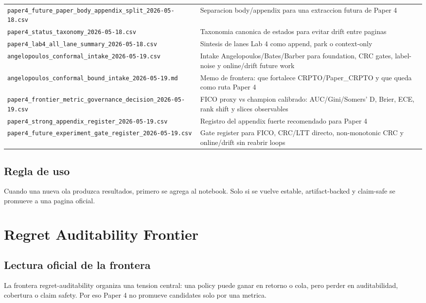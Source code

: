 \documentclass[
  spanish,
  11pt,
  letterpaper,
]{scrbook}
\theoremstyle{plain}
\theoremstyle{remark}
\begin{document}
{\begin{longtable}[]{@{}
  >{\raggedright\arraybackslash}p{}
  >{\raggedright\arraybackslash}p{}@{}}
\texttt{paper4\_future\_paper\_body\_appendix\_split\_2026-05-18.csv} &
Separacion body/appendix para una extraccion futura de Paper 4 \\
\texttt{paper4\_status\_taxonomy\_2026-05-18.csv} & Taxonomia canonica
de estados para evitar drift entre paginas \\
\texttt{paper4\_lab4\_all\_lane\_summary\_2026-05-18.csv} & Sintesis de
lanes Lab 4 como append, park o context-only \\
\texttt{angelopoulos\_conformal\_intake\_2026-05-19.csv} & Intake
Angelopoulos/Bates/Barber para foundation, CRC gates, label-noise y
online/drift future work \\
\texttt{angelopoulos\_conformal\_bound\_intake\_2026-05-19.md} & Memo de
frontera: que fortalece CRPTO/Paper\_CRPTO y que queda como ruta Paper
4 \\
\texttt{paper4\_frontier\_metric\_governance\_decision\_2026-05-19.csv}
& FICO proxy vs champion calibrado: AUC/Gini/Somers' D, Brier, ECE, rank
shift y slices observables \\
\texttt{paper4\_strong\_appendix\_register\_2026-05-19.csv} & Registro
del appendix fuerte recomendado para Paper 4 \\
\texttt{paper4\_future\_experiment\_gate\_register\_2026-05-19.csv} &
Gate register para FICO, CRC/LTT directo, non-monotonic CRC y
online/drift sin reabrir loops \\
\end{longtable}
}

\section{Regla de uso}\label{regla-de-uso}

Cuando una nueva ola produzca resultados, primero se agrega al notebook.
Solo si se vuelve estable, artifact-backed y claim-safe se promueve a
una pagina oficial.

\chapter{Regret Auditability
Frontier}\label{regret-auditability-frontier}

\section{Lectura oficial de la
frontera}\label{lectura-oficial-de-la-frontera}

La frontera regret-auditability organiza una tension central: una policy
puede ganar en retorno o cola, pero perder en auditabilidad, cobertura o
claim safety. Por eso Paper 4 no promueve candidates solo por una
metrica.
\end{document}
